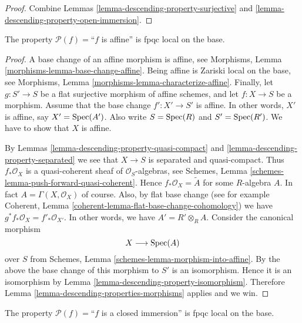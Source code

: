 \begin{proof}
Combine Lemmas \ref{lemma-descending-property-surjective}
and \ref{lemma-descending-property-open-immersion}.
\end{proof}

\begin{lemma}
\label{lemma-descending-property-affine}
The property $\mathcal{P}(f) =$``$f$ is affine''
is fpqc local on the base.
\end{lemma}

\begin{proof}
A base change of an affine morphism is affine, see
Morphisms, Lemma \ref{morphisms-lemma-base-change-affine}.
Being affine is Zariski local on the base, see
Morphisms, Lemma \ref{morphisms-lemma-characterize-affine}.
Finally, let
$g : S' \to S$ be a flat surjective morphism of affine schemes,
and let $f : X \to S$ be a morphism. Assume that the base change
$f' : X' \to S'$ is affine. In other words, $X'$ is affine, say
$X' = \mathop{\rm Spec}(A')$. Also write $S = \mathop{\rm Spec}(R)$
and $S' = \mathop{\rm Spec}(R')$. We have to show that $X$ is affine.

\medskip\noindent
By Lemmas \ref{lemma-descending-property-quasi-compact}
and \ref{lemma-descending-property-separated} we see that
$X \to S$ is separated and quasi-compact. Thus
$f_*\mathcal{O}_X$ is a quasi-coherent sheaf of $\mathcal{O}_S$-algebras,
see Schemes, Lemma \ref{schemes-lemma-push-forward-quasi-coherent}.
Hence $f_*\mathcal{O}_X = \widetilde{A}$ for some $R$-algebra $A$.
In fact $A = \Gamma(X, \mathcal{O}_X)$ of course.
Also, by flat base change
(see for example
Coherent, Lemma \ref{coherent-lemma-flat-base-change-cohomology})
we have $g^*f_*\mathcal{O}_X = f'_*\mathcal{O}_{X'}$.
In other words, we have $A' = R' \otimes_R A$.
Consider the canonical morphism
$$
X \longrightarrow \mathop{\rm Spec}(A)
$$
over $S$ from Schemes, Lemma \ref{schemes-lemma-morphism-into-affine}.
By the above the base change of this morphism to $S'$ is an isomorphism.
Hence it is an isomorphism by
Lemma \ref{lemma-descending-property-isomorphism}.
Therefore Lemma \ref{lemma-descending-properties-morphisms} applies and we win.
\end{proof}

\begin{lemma}
\label{lemma-descending-property-closed-immersion}
The property $\mathcal{P}(f) =$``$f$ is a closed immersion''
is fpqc local on the base.
\end{lemma}

